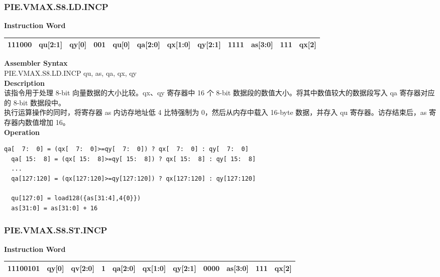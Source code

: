 \newpage
\subsubsection{PIE.VMAX.S8.LD.INCP}\label{instruction:PIEVMAXS8LDINCP}
\setlength\tabcolsep{6pt}
\textbf{Instruction Word} \\
\begin{tabular}{|c|c|c|c|c|c|c|c|c|c|c|c|}
	\hline
	111000 & qu[2:1] & qy[0] & 001 & qu[0] & qa[2:0] & qx[1:0] & qy[2:1] & 1111 & as[3:0] & 111 & qx[2] \\
	\hline
\end{tabular}

\textbf{Assembler Syntax} \\
PIE.VMAX.S8.LD.INCP qu, as, qa, qx, qy \\
\textbf{Description} \\
该指令用于处理 8-bit 向量数据的大小比较。qx、qy 寄存器中 16 个 8-bit 数据段的数值大小。将其中数值较大的数据段写入 qa 寄存器对应的 8-bit 数据段中。\\
执行运算操作的同时，将寄存器 as 内访存地址低 4 比特强制为 0，然后从内存中载入 16-byte 数据，并存入 qu 寄存器。访存结束后，as 寄存器内数值增加 16。\\
\textbf{Operation}
\begin{lstlisting}[escapeinside=`?]
  qa[  7:  0] = (qx[  7:  0]>=qy[  7:  0]) ? qx[  7:  0] : qy[  7:  0]
  qa[ 15:  8] = (qx[ 15:  8]>=qy[ 15:  8]) ? qx[ 15:  8] : qy[ 15:  8]
  ...
  qa[127:120] = (qx[127:120]>=qy[127:120]) ? qx[127:120] : qy[127:120]

  qu[127:0] = load128({as[31:4],4{0}})
  as[31:0] = as[31:0] + 16
\end{lstlisting}

\newpage
\subsubsection{PIE.VMAX.S8.ST.INCP}\label{instruction:PIEVMAXS8STINCP}
\setlength\tabcolsep{6pt}
\textbf{Instruction Word} \\
\begin{tabular}{|c|c|c|c|c|c|c|c|c|c|c|}
	\hline
	11100101 & qy[0] & qv[2:0] & 1 & qa[2:0] & qx[1:0] & qy[2:1] & 0000 & as[3:0] & 111 & qx[2] \\
	\hline
\end{tabular}

